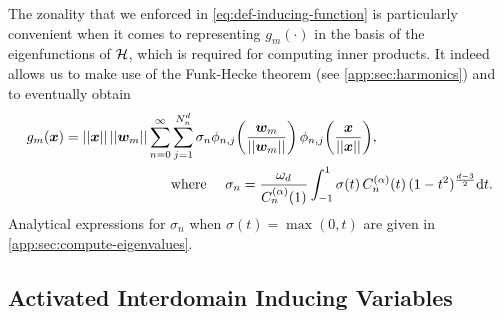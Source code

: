 The zonality that we enforced in \cref{eq:def-inducing-function} is particularly convenient when it comes to representing $g_m(\cdot)$ in the basis of the eigenfunctions of ${\mathcal{H}}$, which is required for computing inner products. It indeed allows us to make use of the Funk-Hecke theorem (see \cref{app:sec:harmonics}) and to eventually obtain
\begin{equation}
\begin{aligned}
\label{eq:fourier-decomposition-activation-functions-new}
    g_m(\vx) = \norm{\vx}\, \norm{\vw_m} \sum_{n=0}^\infty &\sum_{j=1}^{\dnumharmonicsforlevel}  \sigma_n \sh_{n, j}\left(\frac{\vw_m}{\norm{\vw_m}}\right)\, \sh_{n, j}\left(\frac{\vx}{\norm{\vx}}\right), \\
   & \text{where \quad} \sigma_{n} = 
   \frac{\omega_{d}}{C_n^{(\alpha)}(1)} \int_{-1}^1 \sigma(t)\,C_n^{(\alpha)}(t)\,(1 - t^2)^{\frac{d-3}{2}} \calcd{t}.
\end{aligned}
\end{equation}
Analytical expressions for $\sigma_n$ when $\sigma(t)=\max(0, t)$ are given in \cref{app:sec:compute-eigenvalues}.





\subsection{Activated Interdomain Inducing Variables}
\label{sec:relu-inducing-variables}


